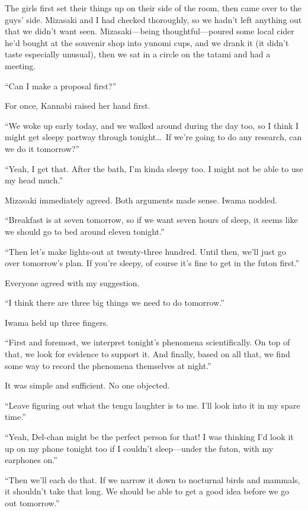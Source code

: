 \documentclass[
    a4paper,
    12pt,
    twoside,
    openany,
    UTF8,
    fontset=windows
]{ctexbook}
\begin{document}
The girls first set their things up on their side of the room, then came over to the guys' side. Mizasaki and I had checked thoroughly, so we hadn't left anything out that we didn't want seen. Mizasaki---being thoughtful---poured some local cider he'd bought at the souvenir shop into yunomi cups, and we drank it (it didn't taste especially unusual), then we sat in a circle on the tatami and had a meeting.

``Can I make a proposal first?''

For once, Kannabi raised her hand first.

``We woke up early today, and we walked around during the day too, so I think I might get sleepy partway through tonight\dots\ If we're going to do any research, can we do it tomorrow?''

``Yeah, I get that. After the bath, I'm kinda sleepy too. I might not be able to use my head much.''

Mizasaki immediately agreed. Both arguments made sense. Iwama nodded.

``Breakfast is at seven tomorrow, so if we want seven hours of sleep, it seems like we should go to bed around eleven tonight.''

``Then let's make lights-out at twenty-three hundred. Until then, we'll just go over tomorrow's plan. If you're sleepy, of course it's fine to get in the futon first.''

Everyone agreed with my suggestion.

``I think there are three big things we need to do tomorrow.''

Iwama held up three fingers.

``First and foremost, we interpret tonight's phenomena scientifically. On top of that, we look for evidence to support it. And finally, based on all that, we find some way to record the phenomena themselves at night.''

It was simple and sufficient. No one objected.

``Leave figuring out what the tengu laughter is to me. I'll look into it in my spare time.''

``Yeah, Del-chan might be the perfect person for that! I was thinking I'd look it up on my phone tonight too if I couldn't sleep---under the futon, with my earphones on.''

``Then we'll each do that. If we narrow it down to nocturnal birds and mammals, it shouldn't take that long. We should be able to get a good idea before we go out tomorrow.''
\end{document}
